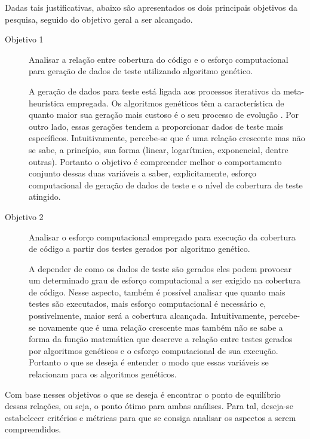 Dadas tais justificativas, abaixo são apresentados os dois principais objetivos da pesquisa, seguido do objetivo geral a ser alcançado. 

\makeatletter
\def\namedlabel#1#2{\begingroup
    #2%
    \def\@currentlabel{#2}%
    \label{#1}\endgroup
}
\begin{description}
\item[\namedlabel{obj1}{Objetivo 1}] Analisar a relação entre cobertura do código e o esforço computacional para geração de dados de teste utilizando algoritmo genético.

A geração de dados para teste está ligada aos processos iterativos da meta-heurística empregada. Os algoritmos genéticos têm a característica de quanto maior sua geração mais custoso é o seu processo de evolução \cite{pargas1999test}. Por outro lado, essas gerações tendem a proporcionar dados de teste mais específicos. Intuitivamente, percebe-se que é uma relação crescente mas não se sabe, a princípio, sua forma (linear, logarítmica, exponencial, dentre outras). Portanto o objetivo é compreender melhor o comportamento conjunto dessas duas variáveis a saber, explicitamente, esforço computacional de geração de dados de teste e o  nível de cobertura de teste atingido. 
		

\item[\namedlabel{obj2}{Objetivo 2}] Analisar o esforço computacional empregado para execução da cobertura de código a partir dos testes gerados por algoritmo genético.

A depender de como os dados de teste são gerados eles podem provocar um determinado grau de esforço computacional a ser exigido na cobertura de código.  Nesse aspecto, também é possível analisar que quanto mais testes são executados, mais esforço computacional é necessário e, possivelmente, maior será a cobertura alcançada. Intuitivamente, percebe-se novamente que é uma relação crescente mas também não se sabe a forma da função matemática que descreve a relação entre testes gerados por algoritmos genéticos e o esforço computacional de sua execução. Portanto o que se deseja é entender o modo que essas variáveis se relacionam para os algoritmos genéticos.

\end{description}

Com base nesses objetivos o que se deseja é encontrar o ponto de equilíbrio dessas relações, ou seja,  o ponto ótimo para ambas análises. Para tal, deseja-se estabelecer critérios e métricas para que se consiga analisar os aspectos a serem compreendidos. 

